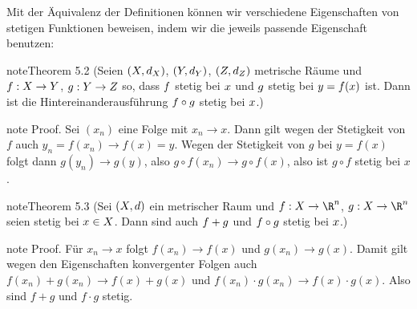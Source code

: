 \documentclass[letterpaper,10pt,english]{jupyterBook}
\begin{document}
Mit der Äquivalenz der Definitionen können wir verschiedene Eigenschaften von stetigen Funktionen beweisen, indem wir die jeweils passende Eigenschaft benutzen:
\label{stetigkeit/stetigkeit:theorem-5}
\begin{sphinxadmonition}{note}{Theorem 5.2 (Seien \protect\((X,d_X)\protect\), \protect\((Y,d_Y)\protect\), \protect\((Z,d_Z)\protect\) metrische Räume und \protect\(f: X \rightarrow Y\protect\), \protect\(g: Y \rightarrow Z\protect\) so, dass \protect\(f\protect\) stetig bei \protect\(x\protect\) und \protect\(g\protect\) stetig bei \protect\(y=f(x)\protect\) ist. Dann ist die Hintereinanderausführung \protect\(f \circ g\protect\) stetig bei \protect\(x\protect\).)}


\end{sphinxadmonition}

\begin{sphinxadmonition}{note}
Proof.  Sei \((x_n)\) eine Folge mit \(x_n \rightarrow x\). Dann gilt wegen der Stetigkeit von \(f\) auch \(y_n=f(x_n) \rightarrow f(x) = y\). Wegen der Stetigkeit von \(g\) bei \(y=f(x)\) folgt dann \(g(y_n) \rightarrow g(y)\), also \(g\circ f(x_n) \rightarrow g \circ f(x)\), also ist \(g \circ f\) stetig bei \(x\).
\end{sphinxadmonition}
\label{stetigkeit/stetigkeit:theorem-6}
\begin{sphinxadmonition}{note}{Theorem 5.3 (Sei \protect\((X,d)\protect\) ein metrischer Raum und \protect\(f: X \rightarrow \R^n\protect\), \protect\(g: X \rightarrow \R^n\protect\) seien stetig bei \protect\(x \in X\protect\). Dann sind auch \protect\(f +g \protect\) und \protect\(f \circ g\protect\) stetig bei \protect\(x\protect\).)}


\end{sphinxadmonition}

\begin{sphinxadmonition}{note}
Proof.  Für \(x_n \rightarrow x\) folgt \(f(x_n) \rightarrow f(x)\) und \(g(x_n) \rightarrow g(x)\). Damit gilt wegen den Eigenschaften konvergenter Folgen auch \(f(x_n) + g(x_n) \rightarrow f(x) + g(x)\) und
\(f(x_n) \cdot g(x_n) \rightarrow f(x) \cdot g(x)\). Also sind \(f+g\) und \(f \cdot g\) stetig.
\end{sphinxadmonition}
\end{document}
